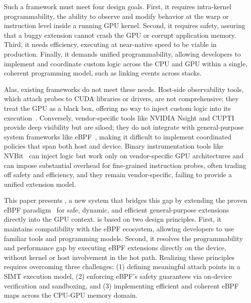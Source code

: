 Such a framework must meet four design goals. First, it requires intra-kernel programmability, the ability to observe and modify behavior at the warp or instruction level inside a running GPU kernel. Second, it requires safety, assuring that a buggy extension cannot crash the GPU or corrupt application memory. Third, it needs efficiency, executing at near-native speed to be viable in production. Finally, it demands unified programmability, allowing developers to implement and coordinate custom logic across the CPU and GPU within a single, coherent programming model, such as linking events across stacks.

Alas, existing frameworks do not meet these needs. Host-side observability tools, which attach probes to CUDA libraries or drivers, are not comprehensive; they treat the GPU as a black box, offering no way to inject custom logic into its execution~\cite{hong2017gpu,kato2011timegraph}. Conversely, vendor-specific tools like NVIDIA Nsight and CUPTI~\cite{cupti} provide deep visibility but are siloed; they do not integrate with general-purpose system frameworks like eBPF~\cite{gregg16,gregg2021computing,Bachl21,jia2023practical,Zhong22,yang2023lambda,jia2023programmable,ghigoff2021bmc,chen2025etran,xu2025state,benson2024netedit,zhou2024dint,wu2025vep,bpftime,mao2024merlin,jin2024beebox,wang2024seak,zhong2022xrp}, making it difficult to implement coordinated policies that span both host and device. Binary instrumentation tools like NVBit~\cite{villa2019nvbit} can inject logic but work only on vendor-specific GPU architectures and can impose substantial overhead for fine-grained instruction probes, often trading off safety and efficiency, and they remain vendor-specific, failing to provide a unified extension model.

This paper presents \sys, a new system that bridges this gap by extending the proven eBPF paradigm~\cite{eBPFWindows} for safe, dynamic, and efficient general-purpose extensions directly into the GPU context. \sys is based on two design principles. First, it maintains compatibility with the eBPF ecosystem, allowing developers to use familiar tools and programming models. Second, it resolves the programmability and performance gap by executing eBPF extensions directly on the device, without kernel or host involvement in the hot path. Realizing these principles requires overcoming three challenges: (1) defining meaningful attach points in a SIMT execution model, (2) enforcing eBPF's safety guarantees via on-device verification and sandboxing, and (3) implementing efficient and coherent eBPF maps across the CPU-GPU memory domain.

